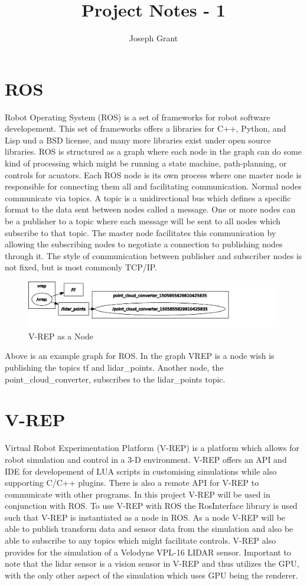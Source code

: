 \documentclass{article}
\begin{document}
\title{Project Notes - 1}
\author{Joseph Grant}
\maketitle


\begin{multicols*}{2}
\section{ROS}
Robot Operating System (ROS) is a set of frameworks for robot software developement. This set of frameworks offers a libraries for C++, Python, and Lisp und a BSD license, and many more libraries exist under open source libraries. ROS is structured as a graph where each node in the graph can do some kind of processing which might be running a state machine, path-planning, or controls for acuators. Each ROS node is its own process where one master node is responsible for connecting them all and facilitating communication. Normal nodes communicate via topics. A topic is a unidirectional bus which defines a specific format to the data sent between nodes called a message. One or more nodes can be a publisher to a topic where each message will be sent to all nodes which subscribe to that topic. The master node facilitates this communication by allowing the subscribing nodes to negotiate a connection to publishing nodes through it. The style of communication between publisher and subscriber nodes is not fixed, but is most commonly TCP/IP. 
\begin{figure}[H]
  \centering
  \includegraphics[scale=.22]{index.png} 
  \caption{V-REP as a Node}
\end{figure}
\noindent Above is an example graph for ROS. In the graph VREP is a node wish is publishing the topics tf and lidar\_points. Another node, the point\_cloud\_converter, subscribes to the lidar\_points topic. 
\section{V-REP}
Virtual Robot Experimentation Platform (V-REP) is a platform which allows for robot simulation and control in a 3-D environment. V-REP offers an API and IDE for developement of LUA scripts in customising simulations while also supporting C/C++ plugins. There is also a remote API for V-REP to communicate with other programs. In this project V-REP will be used in conjunction with ROS. To use V-REP with ROS the RosInterface library is used such that V-REP is instantiated as a node in ROS. As a node V-REP will be able to publish transform data and sensor data from the simulation and also be able to subscribe to any topics which might facilitate controls. V-REP also provides for the simulation of a Velodyne VPL-16 LIDAR sensor. Important to note that the lidar sensor is a vision sensor in V-REP and thus utilizes the GPU, with the only other aspect of the simulation which uses GPU being the renderer.  

\end{multicols*}
\end{document}
